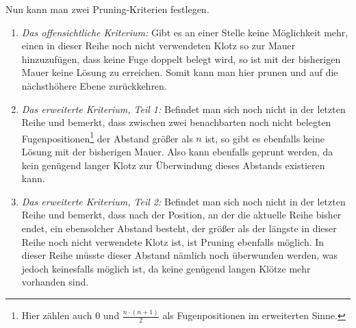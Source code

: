 \documentclass[a4paper, notitlepage, 12pt]{scrartcl}
\begin{document}
Nun kann man zwei Pruning-Kriterien festlegen.
\begin{enumerate}
\item \textit{Das offensichtliche Kriterium:} Gibt es an einer Stelle keine Möglichkeit mehr, einen in dieser Reihe noch nicht verwendeten Klotz so zur Mauer hinzuzufügen, dass keine Fuge doppelt belegt wird, so ist mit der bisherigen Mauer keine Lösung zu erreichen. Somit kann man hier prunen und auf die nächsthöhere Ebene zurückkehren.
\item \textit{Das erweiterte Kriterium, Teil 1:} Befindet man sich noch nicht in der letzten Reihe und bemerkt, dass zwischen zwei benachbarten noch nicht belegten Fugenpositionen\footnote{Hier zählen auch 0 und $\frac{n \cdot (n+1) }{2}$ als Fugenpositionen im erweiterten Sinne.} der Abstand größer als $n$ ist, so gibt es ebenfalls keine Lösung mit der bisherigen Mauer. Also kann ebenfalls geprunt werden, da kein genügend langer Klotz zur Überwindung dieses Abstands existieren kann.
\item \textit{Das erweiterte Kriterium, Teil 2:} Befindet man sich noch nicht in der letzten Reihe und bemerkt, dass nach der Position, an der die aktuelle Reihe bisher endet, ein ebensolcher Abstand besteht, der größer als der längste in dieser Reihe noch nicht verwendete Klotz ist, ist Pruning ebenfalls möglich. In dieser Reihe müsste dieser Abstand nämlich noch überwunden werden, was jedoch keinesfalls möglich ist, da keine genügend langen Klötze mehr vorhanden sind.
\end{enumerate}
\end{document}
